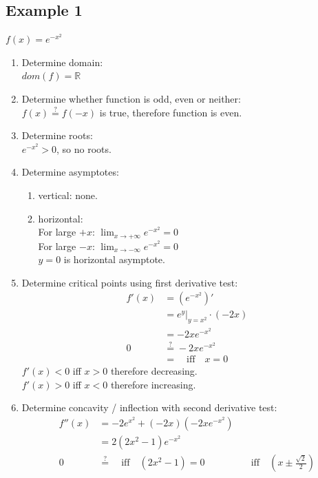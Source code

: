 \subsection{Example 1}
$f(x) = e^{-x^2}$
\begin{enumerate}
  \item Determine domain:\\
  $dom(f) = \mathbb{R}$
  \item Determine whether function is odd, even or neither: \\
  $f(x) \stackrel{?}{=} f(-x)$ is true, therefore function is even.
  \item Determine roots: \\
  $e^{-x^2} > 0$, so no roots.
  \item Determine asymptotes:
  \begin{enumerate}
    \item vertical: none.
    \item horizontal: \\
    For large $+x$: $\lim_{x \to +\infty} e^{-x^2} = 0$ \\
    For large $-x$: $\lim_{x \to -\infty} e^{-x^2} = 0$ \\
    $y=0$ is horizontal asymptote.
  \end{enumerate}
  \item Determine critical points using first derivative test: \\
  \begin{align}
    f'(x) &= \left(e^{-x^2}\right)' \\
          &= \left.e^y\right|_{y=x^2} \cdot (-2x) \\
          &= -2xe^{-x^2} \\
        0 &\stackrel{?}{=} -2xe^{-x^2} \\
          &= \quad \text{iff} \quad x=0
  \end{align}
  $f'(x) < 0$ iff $x > 0$ therefore decreasing. \\
  $f'(x) > 0$ iff $x < 0$ therefore increasing.
  \item Determine concavity / inflection with second derivative test: \\
  \begin{align}
    f''(x) &= -2e^{x^2} + (-2x)(-2xe^{-x^2}) \\
           &= 2(2x^2 -1)e^{-x^2} \\
          0&\stackrel{?}{=} \quad \text{iff} \quad (2x^2 - 1) = 0
          & \quad \text{iff} \quad (x \pm \frac{\sqrt{2}}{2})
  \end{align}

\end{enumerate}
